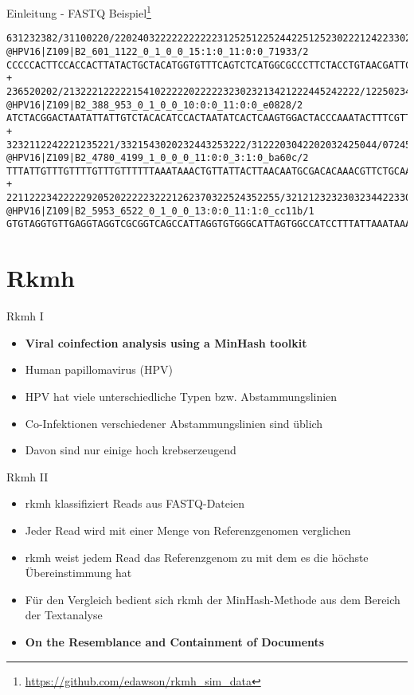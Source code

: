 \begin{frame}[fragile]{Einleitung - FASTQ Beispiel\footnote{\url{https://github.com/edawson/rkmh_sim_data}}}
    \begin{verbatim}
631232382/31100220/2202403222222222223125251225244225125230222124223302
@HPV16|Z109|B2_601_1122_0_1_0_0_15:1:0_11:0:0_71933/2
CCCCCACTTCCACCACTTATACTGCTACATGGTGTTTCAGTCTCATGGCGCCCTTCTACCTGTAACGATTC
+
236520202/2132221222221541022222022222323023213421222445242222/12250234
@HPV16|Z109|B2_388_953_0_1_0_0_10:0:0_11:0:0_e0828/2
ATCTACGGACTAATATTATTGTCTACACATCCACTAATATCACTCAAGTGGACTACCCAAATACTTTCGTT
+
3232112242221235221/3321543020232443253222/3122203042202032425044/07245
@HPV16|Z109|B2_4780_4199_1_0_0_0_11:0:0_3:1:0_ba60c/2
TTTATTGTTTGTTTTGTTTGTTTTTTAAATAAACTGTTATTACTTAACAATGCGACACAAACGTTCTGCAA
+
221122234222229205202222232221262370322524352255/3212123232303234422330
@HPV16|Z109|B2_5953_6522_0_1_0_0_13:0:0_11:1:0_cc11b/1
GTGTAGGTGTTGAGGTAGGTCGCGGTCAGCCATTAGGTGTGGGCATTAGTGGCCATCCTTTATTAAATAAA
    \end{verbatim}
\end{frame}

\section{Rkmh}

\begin{frame}{Rkmh I}
    \begin{itemize}
        \item \textbf{Viral coinfection analysis using a MinHash toolkit \cite{rkmh}}
        \item Human papillomavirus (HPV)
        \item HPV hat viele unterschiedliche Typen bzw. Abstammungslinien
        \item Co-Infektionen verschiedener Abstammungslinien sind üblich
        \item Davon sind nur einige hoch krebserzeugend
    \end{itemize}
\end{frame}

\begin{frame}{Rkmh II}
    \begin{itemize}
        \item rkmh klassifiziert Reads aus FASTQ-Dateien
        \item Jeder Read wird mit einer Menge von Referenzgenomen verglichen
        \item rkmh weist jedem Read das Referenzgenom zu mit dem es die höchste Übereinstimmung hat
        \item Für den Vergleich bedient sich rkmh der MinHash-Methode  aus dem Bereich der Textanalyse
        \item \textbf{On the Resemblance and Containment of Documents \cite{minhash}}
    \end{itemize}
\end{frame}